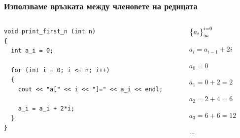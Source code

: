 \documentclass{beamer}
\begin{document}
\begin{frame}[fragile]
\frametitle{Използваме връзката между членовете на редицата}


\begin{columns}[t]
  \begin{column}{0.7\textwidth}

\begin{lstlisting}
void print_first_n (int n)
{
  int a_i = 0;

  for (int i = 0; i <= n; i++)
  {
    cout << "a[" << i << "]=" << a_i << endl;

    a_i = a_i + 2*i;
  }
}
\end{lstlisting}


  \end{column}
  \begin{column}{0.3\textwidth}
\begin{flushleft}

  $\big{\{}a_i\big{\}}_\infty^{i=0}$

  \vspace{10px}

  $a_i = a_{i-1} + 2i$

  \vspace{30px}

  $a_0 = 0$

  $a_1 = 0 + 2 = 2$

  $a_2 = 2 + 4 = 6$

  $a_3 = 6 + 6 = 12$


  ...


\end{flushleft}
  \end{column}
\end{columns}

\end{frame}
\end{document}
